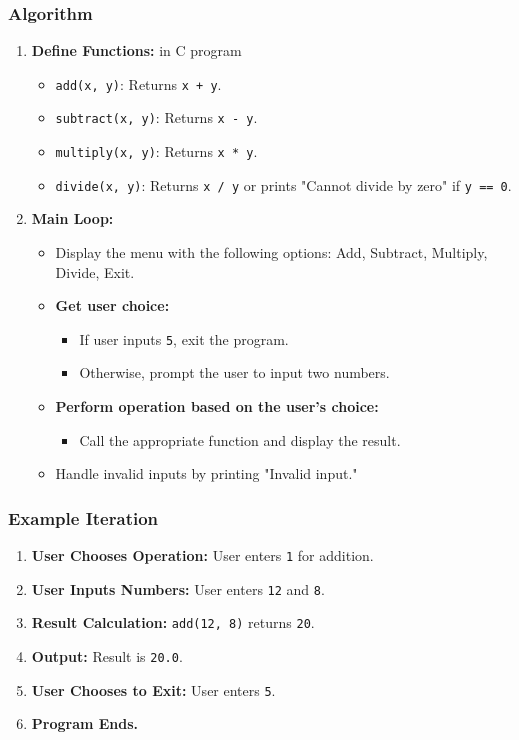 \documentclass[a4paper,12pt]{article}
\begin{document}
\subsubsection*{Algorithm}

\begin{enumerate}
    \item \textbf{Define Functions:} in C program
    \begin{itemize}
        \item \texttt{add(x, y)}: Returns \texttt{x + y}.
        \item \texttt{subtract(x, y)}: Returns \texttt{x - y}.
        \item \texttt{multiply(x, y)}: Returns \texttt{x * y}.
        \item \texttt{divide(x, y)}: Returns \texttt{x / y} or prints "Cannot divide by zero" if \texttt{y == 0}.
    \end{itemize}
    
    \item \textbf{Main Loop:}
    \begin{itemize}
        \item Display the menu with the following options: Add, Subtract, Multiply, Divide, Exit.
        \item \textbf{Get user choice:}
        \begin{itemize}
            \item If user inputs \texttt{5}, exit the program.
            \item Otherwise, prompt the user to input two numbers.
        \end{itemize}
        \item \textbf{Perform operation based on the user's choice:}
        \begin{itemize}
            \item Call the appropriate function and display the result.
        \end{itemize}
        \item Handle invalid inputs by printing "Invalid input."
    \end{itemize}
\end{enumerate}

\subsubsection*{Example Iteration}

\begin{enumerate}
    \item \textbf{User Chooses Operation:} User enters \texttt{1} for addition.
    \item \textbf{User Inputs Numbers:} User enters \texttt{12} and \texttt{8}.
    \item \textbf{Result Calculation:} \texttt{add(12, 8)} returns \texttt{20}.
    \item \textbf{Output:} Result is \texttt{20.0}.
    \item \textbf{User Chooses to Exit:} User enters \texttt{5}.
    \item \textbf{Program Ends.}
\end{enumerate}
\end{document}
